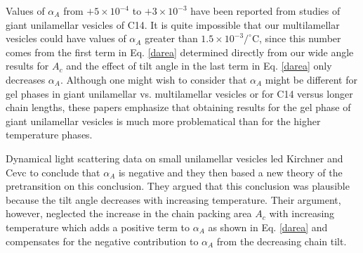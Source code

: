 Values of ${\alpha}_A$ from $+5 \times 10^{-4}$ \cite{Evans82} to
$+3 \times 10^{-3}$ \cite{Need88} have been reported
from studies of giant unilamellar vesicles of C14.
It is quite impossible that our multilamellar vesicles could have
values of ${\alpha}_A$ greater than $1.5 \times 10^{-3}/^{\circ}$C, 
since this number
comes from the first term in Eq. \ref{darea} determined directly
from our wide angle results for $A_c$ 
and the effect of tilt angle in the last term in Eq. \ref{darea}
only decreases ${\alpha}_A$.  Although one might wish to consider 
that ${\alpha}_A$
might be different for gel phases in giant unilamellar vs. multilamellar
vesicles or for C14 versus longer chain lengths, these papers emphasize 
that obtaining
results for the gel phase of giant unilamellar vesicles is much 
more problematical than for the
higher temperature phases. 

Dynamical light scattering data on small unilamellar vesicles
led Kirchner and Cevc \cite{Kir94} to conclude that 
${\alpha}_A$ is negative and they then based a new theory of
the pretransition on this conclusion.  They argued that this conclusion
was plausible because the tilt angle decreases with increasing temperature.  
Their argument, however, neglected the increase in the chain packing area
$A_c$ with increasing temperature which adds a positive term to
${\alpha}_A$ as shown in Eq. \ref{darea} and
compensates for the negative contribution to ${\alpha}_A$ from the decreasing
chain tilt.  
